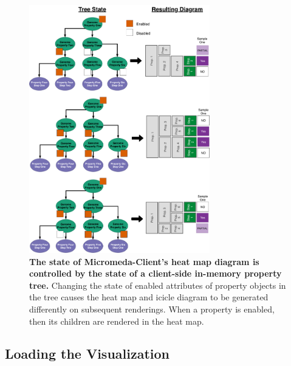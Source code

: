 \begin{figure}[!ht]
  \centering
	\includegraphics[width=0.7\textwidth]{media/how_tree_state_maps.pdf}
	 \caption[The state of Micromeda-Client's heat map diagram is controlled by the state of a client-side in-memory property tree.]{\textbf{The state of Micromeda-Client's heat map diagram is controlled by the state of a client-side in-memory property tree.} Changing the state of enabled attributes of property objects in the tree causes the heat map and icicle diagram to be generated differently on subsequent renderings. When a property is enabled, then its children are rendered in the heat map.}
	 \label{fig:tree-map-to-viz}
\end{figure}

\subsection{Loading the Visualization}

